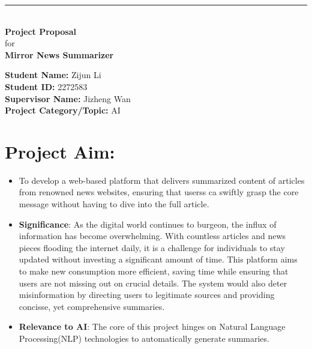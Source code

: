 \documentclass[a4paper]{article}
\begin{document}

\begin{titlepage}
	
	\rule{\linewidth}{5pt}
	\raggedleft
	\fontsize{38pt}{50pt}\selectfont
    \textbf{\\Project Proposal\\}
    \fontsize{28pt}{60pt}\selectfont 
    for\\
    \fontsize{38pt}{60pt}\selectfont 
    \textbf{Mirror News Summarizer\\}
	
	\vfill %
	
	
	\parbox[t]{0.93\textwidth}{ %
		\raggedleft %
		\large %
		{\bf Student Name:} Zijun Li\\
        {\bf Student ID:} 2272583\\
        {\bf Supervisor Name:} Jizheng Wan\\
        {\bf Project Category/Topic:} AI\\
	}
	
\end{titlepage}

\section{Project Aim:}

\begin{itemize}
    \item To develop a web-based platform that delivers summarized content of articles from renowned news websites, ensuring that userss ca swiftly grasp the core message without having to dive into the full article.
    \item {\bf Significance}: As the digital world continues to burgeon, the influx of information has become overwhelming. With countless articles and news pieces flooding the internet daily, it is a challenge for individuals to stay updated without investing a significant amount of time. This platform aims to make new consumption more efficient, saving time while ensuring that users are not missing out on crucial details. The system would also deter misinformation by directing users to legitimate sources and providing concisse, yet comprehensive summaries.
    \item {\bf Relevance to AI}: The core of this project hinges on Natural Language Processing(NLP) technologies to automatically generate summaries.  
\end{itemize}
\end{document}

